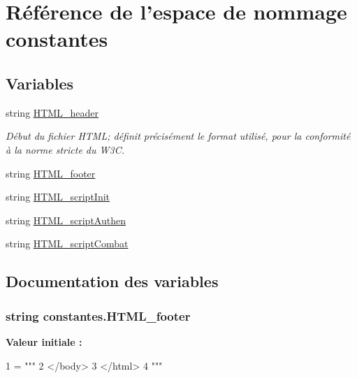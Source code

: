 \hypertarget{namespaceconstantes}{\section{Référence de l'espace de nommage constantes}
\label{namespaceconstantes}
}
\subsection*{Variables}
\begin{DoxyCompactItemize}
\item 
string \hyperlink{namespaceconstantes_a04524e30f424889c8a4407e02f93755f}{H\-T\-M\-L\-\_\-header}
\begin{DoxyCompactList}\small\item\em Début du fichier H\-T\-M\-L; définit précisément le format utilisé, pour la conformité à la norme stricte du W3\-C. \end{DoxyCompactList}\item 
string \hyperlink{namespaceconstantes_a43ef8a067f33f666e58da77fae47ecd4}{H\-T\-M\-L\-\_\-footer}
\item 
string \hyperlink{namespaceconstantes_aa2fb1d8038db179e532f06a5e7bb578b}{H\-T\-M\-L\-\_\-script\-Init}
\item 
string \hyperlink{namespaceconstantes_a4bd1e6c18ef13d98f076c27d0e463532}{H\-T\-M\-L\-\_\-script\-Authen}
\item 
string \hyperlink{namespaceconstantes_a98851e65f9b7b6f42bd22f328e548889}{H\-T\-M\-L\-\_\-script\-Combat}
\end{DoxyCompactItemize}


\subsection{Documentation des variables}
\hypertarget{namespaceconstantes_a43ef8a067f33f666e58da77fae47ecd4}{
\subsubsection[{H\-T\-M\-L\-\_\-footer}]{\setlength{\rightskip}{0pt plus 5cm}string constantes.\-H\-T\-M\-L\-\_\-footer}}\label{namespaceconstantes_a43ef8a067f33f666e58da77fae47ecd4}
{\bfseries Valeur initiale \-:}
\begin{DoxyCode}
1 = \textcolor{stringliteral}{"""}
2 \textcolor{stringliteral}{</body>}
3 \textcolor{stringliteral}{</html>}
4 \textcolor{stringliteral}{"""}
\end{DoxyCode}


